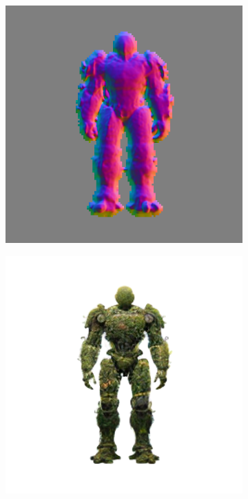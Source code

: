 \begin{figure}[ht]
\begin{subfigure}[b]{0.18\textwidth}
        \includegraphics[width=\textwidth]{etc/a robot made out of plants/wonder3d/test/wonder3D_3000_front_part4}
        \caption{}
    \end{subfigure}
    \begin{subfigure}[b]{0.18\textwidth}
        \centering
        \fontsize{9pt}{7pt}\selectfont{}
        \includegraphics[width=\textwidth]{etc/a robot made out of plants/wonder3d/test/wonder3D_6000_front_part1}

\end{subfigure}
\end{figure}
